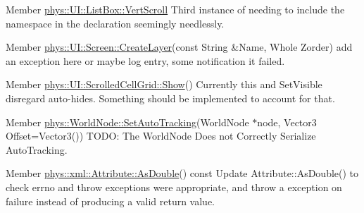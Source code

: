 \label{todo__todo000029}
\hypertarget{todo__todo000029}{}
 
\begin{DoxyDescription}
\item[Member \hyperlink{classphys_1_1UI_1_1ListBox_ab2b012b345ff4bb1a5b228fef88d895c}{phys::UI::ListBox::VertScroll} ]Third instance of needing to include the namespace in the declaration seemingly needlessly. 
\end{DoxyDescription}

\label{todo__todo000030}
\hypertarget{todo__todo000030}{}
 
\begin{DoxyDescription}
\item[Member \hyperlink{classphys_1_1UI_1_1Screen_ad3b73f039f840fd2b2dc20219c428e9d}{phys::UI::Screen::CreateLayer}(const String \&Name, Whole Zorder) ]add an exception here or maybe log entry, some notification it failed. 
\end{DoxyDescription}

\label{todo__todo000031}
\hypertarget{todo__todo000031}{}
 
\begin{DoxyDescription}
\item[Member \hyperlink{classphys_1_1UI_1_1ScrolledCellGrid_af75c87ada3a1bac3dda208485ebc5f94}{phys::UI::ScrolledCellGrid::Show}() ]Currently this and SetVisible disregard auto-\/hides. Something should be implemented to account for that. 
\end{DoxyDescription}

\label{todo__todo000033}
\hypertarget{todo__todo000033}{}
 
\begin{DoxyDescription}
\item[Member \hyperlink{classphys_1_1WorldNode_a3c8447cd6de0af06a6004cdd968671f0}{phys::WorldNode::SetAutoTracking}(WorldNode $\ast$node, Vector3 Offset=Vector3()) ]TODO: The WorldNode Does not Correctly Serialize AutoTracking. 
\end{DoxyDescription}

\label{todo__todo000044}
\hypertarget{todo__todo000044}{}
 
\begin{DoxyDescription}
\item[Member \hyperlink{classphys_1_1xml_1_1Attribute_a467ae167d5407ae3293a22b8873cb43a}{phys::xml::Attribute::AsDouble}() const  ]Update Attribute::AsDouble() to check errno and throw exceptions were appropriate, and throw a exception on failure instead of producing a valid return value. 
\end{DoxyDescription}

